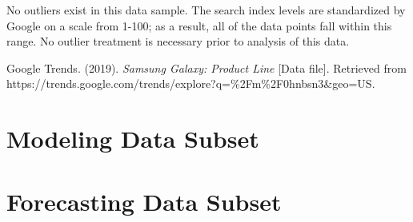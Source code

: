 \documentclass[12pt]{article}
\begin{document}
	No outliers exist in this data sample.  The search index levels are standardized by Google on a scale from 1-100; as a result, all of the data points fall within this range.  No outlier treatment is necessary prior to analysis of this data.

\newpage
\begin{thebibliography}{1}
	
		
	Google Trends. (2019). \textit{Samsung Galaxy: Product Line} [Data file]. Retrieved from https://trends.google.com/trends/explore?q=\%2Fm\%2F0hnbsn3\&geo=US.
	
	
	
\end{thebibliography}

\newpage
\begin{appendices}	
	\section{Modeling Data Subset}
	
\newpage

	\section{Forecasting Data Subset}

\end{appendices}
\end{document}
